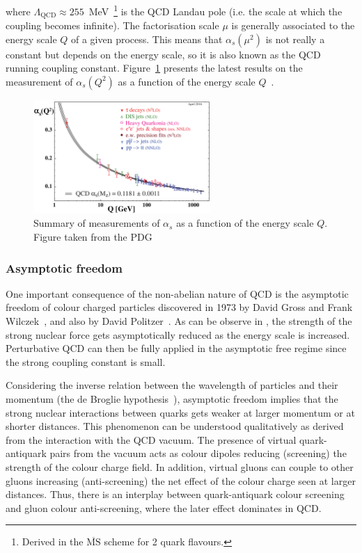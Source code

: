 where $\Lambda_{\text{QCD}} \approx 255$~MeV~\cite{LambdaQCD}\footnote{Derived in the $\overline{\text{MS}}$ scheme for 2 quark flavours.} is the QCD Landau pole (i.e. the scale at which the coupling becomes infinite). The factorisation scale $\mu$ is generally associated to the energy scale $Q$ of a given process. This means that $\alpha_{s}\left(\mu^{2}\right)$ is not really a constant but depends on the energy scale, so it is also known as the QCD running coupling constant. Figure~\ref{fig:Alphas} presents the latest results on the measurement of $\alpha_{s}\left(Q^{2}\right)$ as a function of the energy scale $Q$~\cite{PDG}.

\begin{figure}[htbp]
 \centering
 \includegraphics[width=0.6\textwidth]{Figures/Introduction/StandardModel/Alphas.png}
 \caption{Summary of measurements of $\alpha_{s}$ as a function of the energy scale $Q$. Figure taken from the PDG~\cite{PDG}}
 \label{fig:Alphas}
\end{figure}

\subsubsection{Asymptotic freedom}

One important consequence of the non-abelian nature of QCD is the asymptotic freedom of colour charged particles discovered in 1973 by David Gross and Frank Wilczek~\cite{AsymptoticFreedom_1}, and also by David Politzer~\cite{AsymptoticFreedom_2}. As can be observe in , the strength of the strong nuclear force gets asymptotically reduced as the energy scale is increased. Perturbative QCD can then be fully applied in the asymptotic free regime since the strong coupling constant is small.

Considering the inverse relation between the wavelength of particles and their momentum (the de Broglie hypothesis~\cite{Broglie}), asymptotic freedom implies that the strong nuclear interactions between quarks gets weaker at larger momentum or at shorter distances. This phenomenon can be understood qualitatively as derived from the interaction with the QCD vacuum. The presence of virtual quark-antiquark pairs from the vacuum acts as colour dipoles reducing (screening) the strength of the colour charge field. In addition, virtual gluons can couple to other gluons increasing (anti-screening) the net effect of the colour charge seen at larger distances. Thus, there is an interplay between quark-antiquark colour screening and gluon colour anti-screening, where the later effect dominates in QCD.

